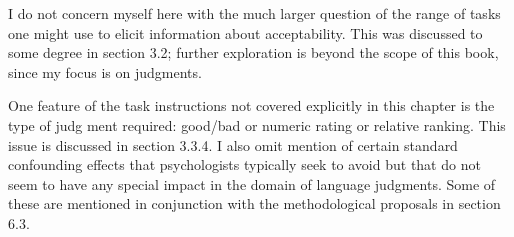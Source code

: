 \begin{listWWNumxxxivleveli}
\item 
\setcounter{listWWNumxxxivlevelii}{0}
\begin{listWWNumxxxivlevelii}
\item 
\setcounter{listWWNumxxxivleveliii}{0}
\begin{listWWNumxxxivleveliii}
\item 
\begin{styleStandard}
I do not concern myself here with the much larger question of the range of tasks one might use to elicit information about acceptability. This was discussed to some degree in section 3.2; further exploration is beyond the scope of this book, since my focus is on judgments.
\end{styleStandard}


\item 
\begin{styleStandard}
One feature of the task instructions not covered explicitly in this chapter is the type of judg\- ment required: good/bad or numeric rating or relative ranking. This issue is discussed in section 3.3.4. I also omit mention of certain standard confounding effects that psychologists typically seek to avoid but that do not seem to have any special impact in the domain of language judgments. Some of these are mentioned in conjunction with the methodological proposals in section 6.3.
\end{styleStandard}


\end{listWWNumxxxivleveliii}
\end{listWWNumxxxivlevelii}
\end{listWWNumxxxivleveli}
